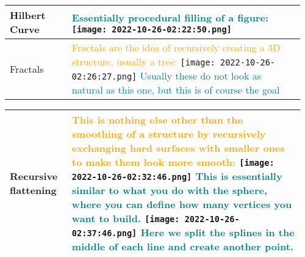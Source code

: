 \documentclass[main.tex,fontsize=8pt,paper=a4,paper=portrait,DIV=calc,]{scrartcl}
\begin{document}
\begin{table}[ht!]
\begin{tabular}{|m{0.2\linewidth}|m{0.755\linewidth}|}
\hline
Hilbert Curve & 
\textcolor{teal}{Essentially procedural filling of a figure:}\newline 
\texttt{[image: 2022-10-26-02:22:50.png]}\\
\hline
Fractals & 
\textcolor{orange}{Fractals are the idea of recursively creating a 3D structure, usually a tree:}\newline
\texttt{[image: 2022-10-26-02:26:27.png]}\newline
\textcolor{teal}{Usually these do not look as natural as this one, but this is of course the goal}\\
\hline
\end{tabular}
\end{table}
\pagebreak
\begin{table}[ht!]
\begin{tabular}{|m{0.2\linewidth}|m{0.755\linewidth}|}
\hline
Recursive flattening & 
\textcolor{orange}{This is nothing else other than the smoothing of a structure by recursively exchanging hard surfaces with smaller ones to make them look more smooth:}\newline
\texttt{[image: 2022-10-26-02:32:46.png]}\newline
\textcolor{teal}{This is essentially similar to what you do with the sphere, where you can define how many vertices you want to build.}\newline
\texttt{[image: 2022-10-26-02:37:46.png]}\newline
\textcolor{teal}{Here we split the splines in the middle of each line and create another point.}\\
\hline
\end{tabular}

\end{table}
\end{document}
